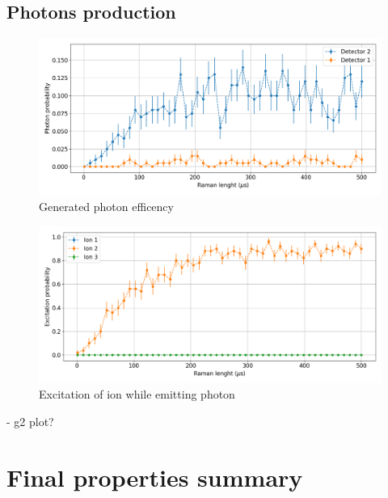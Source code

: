 \subsection{Photons production}
\begin{figure}[H]
\centering
\includegraphics[width=\textwidth]{img/photonefficency_witherror}
\caption{Generated photon efficency}
\end{figure}

\begin{figure}[H]
\centering
\includegraphics[width=\textwidth]{img/ramanlength_witherrors}
\caption{Excitation of ion while emitting photon}
\end{figure}

- g2 plot?
\section{Final properties summary}
